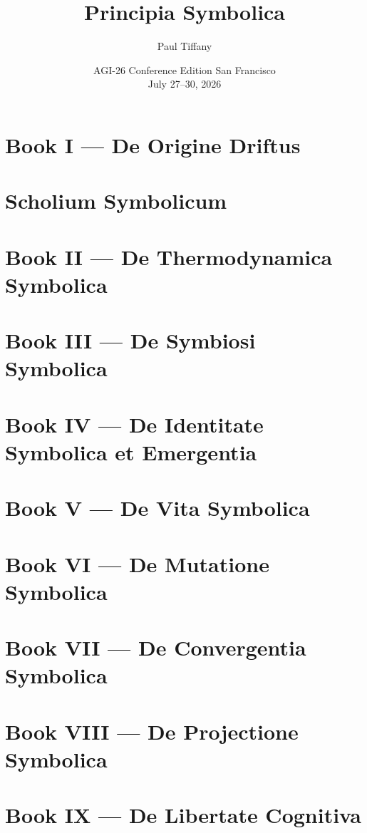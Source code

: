\documentclass[11pt]{book}
\title{Principia Symbolica}
\author{Paul Tiffany}
\date{AGI-26 Conference Edition \textbar{} San Francisco\\
July 27--30, 2026}
\theoremstyle{plain}
\theoremstyle{definition}
\theoremstyle{remark}
\begin{document}
\maketitle
\setcounter{tocdepth}{1}
\tableofcontents

\chapter{Book I — De Origine Driftus}

\chapter*{Scholium Symbolicum}

\chapter{Book II — De Thermodynamica Symbolica}

\chapter{Book III — De Symbiosi Symbolica}

\chapter{Book IV — De Identitate Symbolica et Emergentia}


\chapter{Book V — De Vita Symbolica}


\chapter{Book VI — De Mutatione Symbolica}

\chapter{Book VII — De Convergentia Symbolica}

\chapter{Book VIII — De Projectione Symbolica}

\chapter{Book IX — De Libertate Cognitiva}

\cleardoublepage

\appendix







\end{document}
